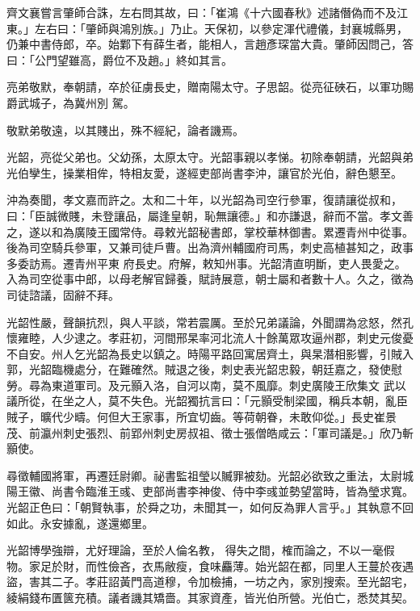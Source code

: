 \begin{pinyinscope}
 齊文襄嘗言肇師合誅，左右問其故，曰：「崔鴻《十六國春秋》述諸僭偽而不及江東。」左右曰：「肇師與鴻別族。」乃止。天保初，以參定渾代禮儀，封襄城縣男，仍兼中書侍郎，卒。始鄴下有薛生者，能相人，言趙彥琛當大貴。肇師因問己，答曰：「公門望雖高，爵位不及趙。」終如其言。



 亮弟敬默，奉朝請，卒於征虜長史，贈南陽太守。子思韶。從亮征硤石，以軍功賜爵武城子，為冀州別
 駕。



 敬默弟敬遠，以其賤出，殊不經紀，論者譏焉。



 光韶，亮從父弟也。父幼孫，太原太守。光韶事親以孝悌。初除奉朝請，光韶與弟光伯孿生，操業相侔，特相友愛，遂經吏部尚書李沖，讓官於光伯，辭色懇至。



 沖為奏聞，孝文嘉而許之。太和二十年，以光韶為司空行參軍，復請讓從叔和，曰：「臣誠微賤，未登讓品，屬逢皇朝，恥無讓德。」和亦謙退，辭而不當。孝文善之，遂以和為廣陵王國常侍。尋敕光韶秘書郎，掌校華林御書。累遷青州中從事。後為司空騎兵參軍，又兼司徒戶曹。出為濟州輔國府司馬，刺史高植甚知之，政事多委訪焉。遷青州平東
 府長史。府解，敕知州事。光韶清直明斷，吏人畏愛之。入為司空從事中郎，以母老解官歸養，賦詩展意，朝士屬和者數十人。久之，徵為司徒諮議，固辭不拜。



 光韶性嚴，聲韻抗烈，與人平談，常若震厲。至於兄弟議論，外聞謂為忿怒，然孔懷雍睦，人少逮之。孝莊初，河間邢杲率河北流人十餘萬眾攻逼州郡，刺史元俊憂不自安。州人乞光韶為長史以鎮之。時陽平路回寓居齊土，與杲潛相影響，引賊入郭，光韶臨機處分，在難確然。賊退之後，刺史表光韶忠毅，朝廷嘉之，發使慰勞。尋為東道軍司。及元顥入洛，自河以南，莫不風靡。刺史廣陵王欣集文
 武以議所從，在坐之人，莫不失色。光韶獨抗言曰：「元顥受制梁國，稱兵本朝，亂臣賊子，曠代少疇。何但大王家事，所宜切齒。等荷朝眷，未敢仰從。」長史崔景茂、前瀛州刺史張烈、前郢州刺史房叔祖、徵士張僧皓咸云：「軍司議是。」欣乃斬顥使。



 尋徵輔國將軍，再遷廷尉卿。祕書監祖瑩以贓罪被劾。光韶必欲致之重法，太尉城陽王徽、尚書令臨淮王彧、吏部尚書李神俊、侍中李彧並勢望當時，皆為瑩求寬。光韶正色曰：「朝賢執事，於舜之功，未聞其一，如何反為罪人言乎。」其執意不回如此。永安據亂，遂還鄉里。



 光韶博學強辯，尤好理論，至於人倫名教，
 得失之間，榷而論之，不以一毫假物。家足於財，而性儉吝，衣馬敝瘦，食味麤薄。始光韶在都，同里人王蔓於夜遇盜，害其二子。孝莊詔黃門高道穆，令加檢捕，一坊之內，家別搜索。至光韶宅，綾絹錢布匱篋充積。議者譏其矯嗇。其家資產，皆光伯所營。光伯亡，悉焚其契。




\end{pinyinscope}
